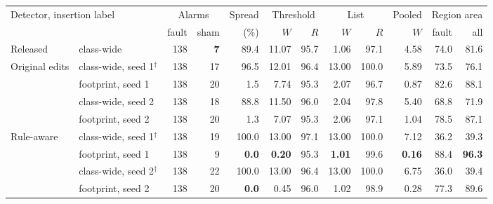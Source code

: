 \begin{tabular}{llrrrrrrrrrr}
\toprule
\multicolumn{2}{l}{Detector, insertion label} & \multicolumn{2}{c}{Alarms} & Spread & \multicolumn{2}{c}{Threshold} & \multicolumn{2}{c}{List} & Pooled & \multicolumn{2}{c}{Region area} \\
\cmidrule(lr){3-4}\cmidrule(lr){6-7}\cmidrule(lr){8-9}\cmidrule(lr){11-12}
 & & fault & sham & (\%) & $W$ & $R$ & $W$ & $R$ & $W$ & fault & all \\
\midrule
Released & class-wide & 138 & \textbf{7} & 89.4 & 11.07 & 95.7 & 1.06 & 97.1 & 4.58 & 74.0 & 81.6 \\
\midrule
Original edits & class-wide, seed 1$^\dagger$ & 138 & 17 & 96.5 & 12.01 & 96.4 & 13.00 & 100.0 & 5.89 & 73.5 & 76.1 \\
 & footprint, seed 1 & 138 & 20 & 1.5 & 7.74 & 95.3 & 2.07 & 96.7 & 0.87 & 82.6 & 88.1 \\
 & class-wide, seed 2 & 138 & 18 & 88.8 & 11.50 & 96.0 & 2.04 & 97.8 & 5.40 & 68.8 & 71.9 \\
 & footprint, seed 2 & 138 & 20 & 1.3 & 7.07 & 95.3 & 2.06 & 97.1 & 1.04 & 78.5 & 87.1 \\
\midrule
Rule-aware & class-wide, seed 1$^\dagger$ & 138 & 19 & 100.0 & 13.00 & 97.1 & 13.00 & 100.0 & 7.12 & 36.2 & 39.3 \\
 & footprint, seed 1 & 138 & 9 & \textbf{0.0} & \textbf{0.20} & 95.3 & \textbf{1.01} & 99.6 & \textbf{0.16} & 88.4 & \textbf{96.3} \\
 & class-wide, seed 2$^\dagger$ & 138 & 22 & 100.0 & 13.00 & 96.4 & 13.00 & 100.0 & 6.75 & 36.0 & 39.4 \\
 & footprint, seed 2 & 138 & 20 & \textbf{0.0} & 0.45 & 96.0 & 1.02 & 98.9 & 0.28 & 77.3 & 89.6 \\
\bottomrule
\end{tabular}
